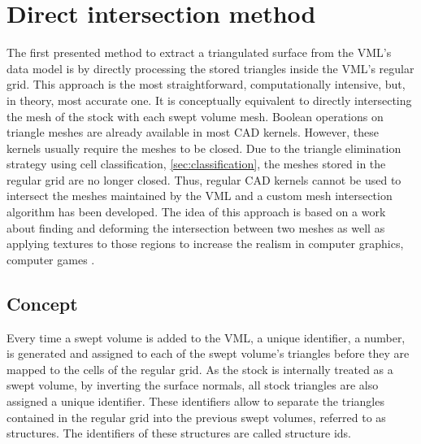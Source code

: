
\chapter{Direct intersection method}
\label{ch:direct_intersection}

The first presented method to extract a triangulated surface from the VML's data model is by directly processing the stored triangles inside the VML's regular grid.
This approach is the most straightforward, computationally intensive, but, in theory, most accurate one.
It is conceptually equivalent to directly intersecting the mesh of the stock with each swept volume mesh.
Boolean operations on triangle meshes are already available in most CAD kernels.
However, these kernels usually require the meshes to be closed.
Due to the triangle elimination strategy using cell classification, \cf \cref{sec:classification}, the meshes stored in the regular grid are no longer closed.
Thus, regular CAD kernels cannot be used to intersect the meshes maintained by the VML and a custom mesh intersection algorithm has been developed.
The idea of this approach is based on a work about finding and deforming the intersection between two meshes as well as applying textures to those regions to increase the realism in computer graphics, \ie computer games \cite{mesh_intersection}.

\section{Concept}
\label{sec:direct_intersection_concept}

Every time a swept volume is added to the VML, a unique identifier, \ie a number, is generated and assigned to each of the swept volume's triangles before they are mapped to the cells of the regular grid.
As the stock is internally treated as a swept volume, by inverting the surface normals, all stock triangles are also assigned a unique identifier.
These identifiers allow to separate the triangles contained in the regular grid into the previous swept volumes, referred to as structures.
The identifiers of these structures are called structure ids.

